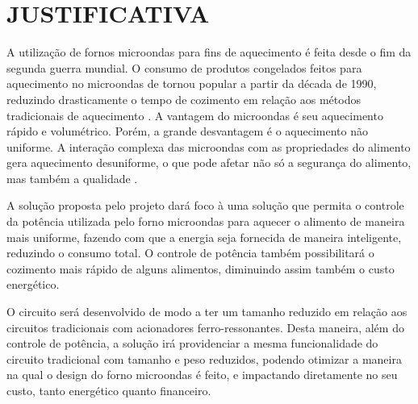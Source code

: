 \section{JUSTIFICATIVA}
\label{sec:justificativa}

A utilização de fornos microondas para fins de aquecimento é feita desde o fim da segunda guerra mundial. O consumo de produtos congelados feitos para aquecimento no microondas de tornou popular a partir da década de 1990, reduzindo drasticamente o tempo de cozimento em relação aos métodos tradicionais de aquecimento \cite{Ohlsson}. A vantagem do microondas é seu aquecimento rápido e volumétrico. Porém, a grande desvantagem é o aquecimento não uniforme. A interação complexa das microondas com as propriedades do alimento gera aquecimento desuniforme, o que pode afetar não só a segurança do alimento, mas também a qualidade \cite{Ma}.

A solução proposta pelo projeto dará foco à uma solução que permita o controle da potência utilizada pelo forno microondas para aquecer o alimento de maneira mais uniforme, fazendo com que a energia seja fornecida de maneira inteligente, reduzindo o consumo total. O controle de potência também possibilitará o cozimento mais rápido de alguns alimentos, diminuindo assim também o custo energético.

O circuito será desenvolvido de modo a ter um tamanho reduzido em relação aos circuitos tradicionais com acionadores ferro-ressonantes. Desta maneira, além do controle de potência, a solução irá providenciar a mesma funcionalidade do circuito tradicional com tamanho e peso reduzidos, podendo otimizar a maneira na qual o design do forno microondas é feito, e impactando diretamente no seu custo, tanto energético quanto financeiro.
